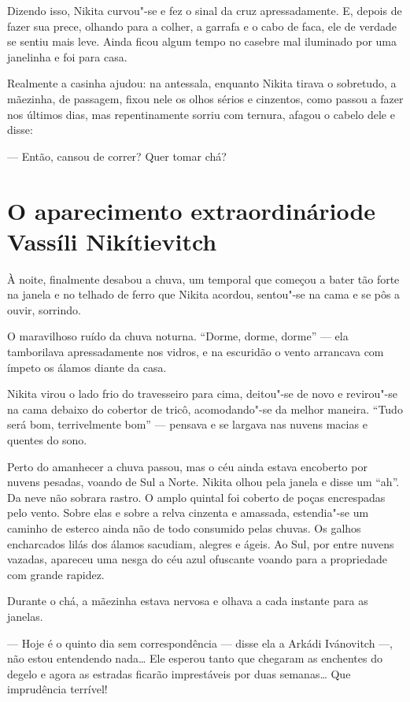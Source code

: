 Dizendo isso, Nikita curvou"-se e fez o sinal da cruz apressadamente. E,
depois de fazer sua prece, olhando para a colher, a garrafa e o cabo de
faca, ele de verdade se sentiu mais leve. Ainda ficou algum tempo no
casebre mal iluminado por uma janelinha e foi para casa.

Realmente a casinha ajudou: na antessala, enquanto Nikita tirava o
sobretudo, a mãezinha, de passagem, fixou nele os olhos sérios e
cinzentos, como passou a fazer nos últimos dias, mas repentinamente sorriu
com ternura, afagou o cabelo dele e disse:

--- Então, cansou de correr? Quer tomar chá?

\chapter{O aparecimento extraordinário\break de Vassíli Nikítievitch}

À noite, finalmente desabou a chuva, um temporal que começou a bater tão
forte na janela e no telhado de ferro que Nikita acordou, sentou"-se na
cama e se pôs a ouvir, sorrindo.

O maravilhoso ruído da chuva noturna. ``Dorme, dorme, dorme'' --- ela
tamborilava apressadamente nos vidros, e na escuridão o vento arrancava
com ímpeto os álamos diante da casa.

Nikita virou o lado frio do travesseiro para cima, deitou"-se de novo e
revirou"-se na cama debaixo do cobertor de tricô, acomodando"-se da melhor
maneira. ``Tudo será bom, terrivelmente bom'' --- pensava e se largava
nas nuvens macias e quentes do sono.

Perto do amanhecer a chuva passou, mas o céu ainda estava encoberto por
nuvens pesadas, voando de Sul a Norte. Nikita olhou pela janela e disse
um ``ah''. Da neve não sobrara rastro. O amplo quintal foi coberto de
poças encrespadas pelo vento. Sobre elas e sobre a relva cinzenta e
amassada, estendia"-se um caminho de esterco ainda não de todo consumido
pelas chuvas. Os galhos encharcados lilás dos álamos sacudiam, alegres e
ágeis. Ao Sul, por entre nuvens vazadas, apareceu uma nesga do céu azul
ofuscante voando para a propriedade com grande rapidez.

Durante o chá, a mãezinha estava nervosa e olhava a cada instante para
as janelas.

--- Hoje é o quinto dia sem correspondência --- disse ela a Arkádi
Ivánovitch ---, não estou entendendo nada\ldots{} Ele esperou tanto que
chegaram as enchentes do degelo e agora as estradas ficarão imprestáveis
por duas semanas\ldots{} Que imprudência terrível!

